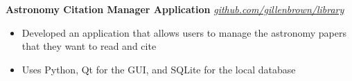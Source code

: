 \documentclass[10pt]{article}
\newcommand{\header}[1]{\vspace{0.7em}\par \textbf{\large #1}\strut\hrule\vspace{-0.6em}}
\newcommand{\actionHeader}[2]{\vspace{0.3em}\textbf{#1} \hfill #2}
\newcommand{\actionHeaderSecondLine}[2]{\newline \textit{#1} \hfill #2}
\begin{document}
\actionHeader{Astronomy Citation Manager Application}{}
\actionHeaderSecondLine{\href{https://github.com/gillenbrown/library/}{github.com/gillenbrown/library}}
\begin{itemize}
    \item Developed an application that allows users to manage the astronomy papers that they want to read and cite
    \item Uses Python, Qt for the GUI, and SQLite for the local database
\end{itemize}




\end{document}
